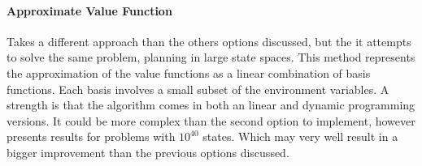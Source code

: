 \paragraph{Approximate Value Function}
Takes a different approach than the others options discussed, but the it attempts to solve the same problem, planning in large state spaces. This method represents the approximation of the value functions as a linear combination of basis functions. Each basis involves a small subset of the environment variables. A strength is that the algorithm comes in both an linear and dynamic programming versions. It could be more complex than the second option to implement, however \textcite{guestrin2003efficient} presents results for problems with $10^{40}$ states. Which may very well result in a bigger improvement than the previous options discussed.


